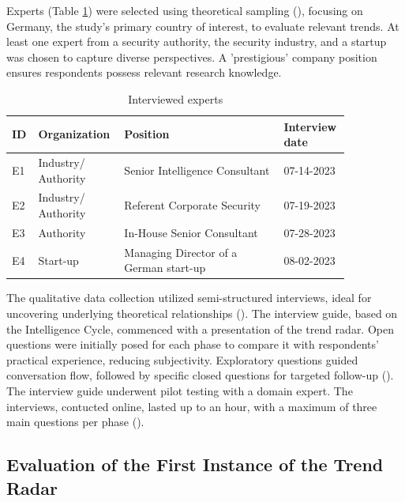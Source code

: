 \documentclass[10pt]{article}
\begin{document}
Experts (Table \ref{tab:experts}) were selected using theoretical sampling (\cite{Glaser.1967}), focusing on Germany, the study's primary country of interest, to evaluate relevant trends. At least one expert from a security authority, the security industry, and a startup was chosen to capture diverse perspectives. A 'prestigious' company position ensures respondents possess relevant research knowledge.

\begin{table}[hbtp]
    \caption{Interviewed experts}
    \begin{tabular}{p{0.05\linewidth}p{0.2\linewidth}p{0.45\linewidth}p{0.15\linewidth}}
        \toprule
        \textbf{ID} & \textbf{Organization} & \textbf{Position}                      & \textbf{Interview date} \\
        \hline
        E1          & Industry/ Authority   & Senior Intelligence Consultant         & 07-14-2023              \\
        \hline
        E2          & Industry/ Authority   & Referent Corporate Security            & 07-19-2023              \\
        \hline
        E3          & Authority             & In-House Senior Consultant             & 07-28-2023              \\
        \hline
        E4          & Start-up              & Managing Director of a German start-up & 08-02-2023              \\
        \bottomrule
    \end{tabular}
    \label{tab:experts}
\end{table}
The qualitative data collection utilized semi-structured interviews, ideal for uncovering underlying theoretical relationships (\cite{Bogner.2014}). The interview guide, based on the Intelligence Cycle, commenced with a presentation of the trend radar. Open questions were initially posed for each phase to compare it with respondents' practical experience, reducing subjectivity. Exploratory questions guided conversation flow, followed by specific closed questions for targeted follow-up (\cite{Saunders.2012}). The interview guide underwent pilot testing with a domain expert. The interviews, contucted online, lasted up to an hour, with a maximum of three main questions per phase (\cite{Bogner.2014}).

\subsection{Evaluation of the First Instance of the Trend Radar}
\end{document}
